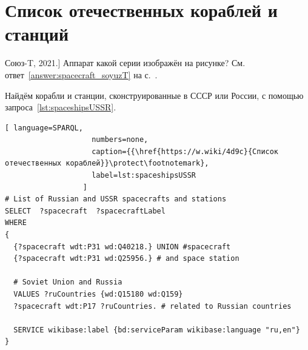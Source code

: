 \section{Список отечественных кораблей и станций}

\begin{marginfigure}
{
	\setlength{\fboxsep}{0pt}%
	\setlength{\fboxrule}{1pt}%
}
\caption
[Союз-T, 2021.]
{
Аппарат какой серии изображён на рисунке?
См. ответ~\ref{answer:spacecraft_soyuzT} на с.~\pageref{answer:spacecraft_soyuzT}.
}
\label{question:spacecraft_soyuzT}
\end{marginfigure}

Найдём корабли и станции, сконструированные в СССР или России, 
с помощью запроса~\ref{lst:spaceshipsUSSR}.

\begin{lstlisting}[ language=SPARQL, 
                    numbers=none, 
                    caption={{\href{https://w.wiki/4d9c}{Список отечественных кораблей}}\protect\footnotemark}, 
                    label=lst:spaceshipsUSSR
                  ]
# List of Russian and USSR spacecrafts and stations
SELECT  ?spacecraft  ?spacecraftLabel 
WHERE
{
  {?spacecraft wdt:P31 wd:Q40218.} UNION #spacecraft
  {?spacecraft wdt:P31 wd:Q25956.} # and space station
  
  # Soviet Union and Russia
  VALUES ?ruCountries {wd:Q15180 wd:Q159}
  ?spacecraft wdt:P17 ?ruCountries. # related to Russian countries
  
  SERVICE wikibase:label {bd:serviceParam wikibase:language "ru,en"}
}
\end{lstlisting}


